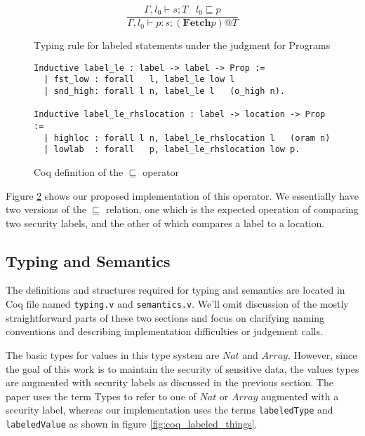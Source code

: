\documentclass[10pt,  onecolumn]{article}
\begin{document}
\begin{figure}
\caption{ Typing rule for labeled statements under the judgment for Programs}
\label{fig:mto_rule_statement}
\[
\frac{ \Gamma, l_{0} \vdash s;T \;\;\; l_{0} \sqsubseteq p }
	{ \Gamma, l_{0} \vdash p:s;(\textbf{Fetch} p)@T}
\]
\end{figure}

\begin{figure}
\caption{ Coq definition of the $\sqsubseteq$ operator }
\label{fig:coq_label_le}
\begin{lstlisting}
Inductive label_le : label -> label -> Prop :=
  | fst_low : forall   l, label_le low l
  | snd_high: forall l n, label_le l   (o_high n).

Inductive label_le_rhslocation : label -> location -> Prop :=
  | highloc : forall l n, label_le_rhslocation l   (oram n)
  | lowlab  : forall   p, label_le_rhslocation low p.
\end{lstlisting}

\end{figure}

Figure \ref{fig:coq_label_le} shows our proposed implementation of this operator.
We essentially have two versions of the $\sqsubseteq$ relation, one which is the expected operation of comparing two security labels, and the other of which compares a label to a location.




\subsection{ Typing and Semantics }

The definitions and structures required for typing and semantics are located in Coq file named \texttt{typing.v} and \texttt{semantics.v}.
We'll omit discussion of the mostly straightforward parts of these two sections and focus on clarifying naming conventions and describing implementation difficulties or judgement calls.

The basic types for values in this type system are $Nat$ and $Array$.
However, since the goal of this work is to maintain the security of sensitive data, the values types are augmented with security labels as discussed in the previous section.
The paper uses the term Types to refer to one of $Nat$ or $Array$ augmented with a security label, whereas our implementation uses the terms \texttt{labeledType} and \texttt{labeledValue} as shown in figure \ref{fig:coq_labeled_things}.
\end{document}
